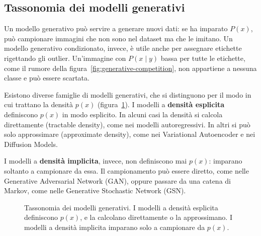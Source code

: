 \subsection{Tassonomia dei modelli generativi}\label{sec:tassonomia-generativi}
Un modello generativo può servire a generare nuovi dati: se ha imparato $P(x)$, può campionare immagini che non sono nel dataset ma che le imitano. Un modello generativo condizionato, invece, è utile anche per assegnare etichette rigettando gli outlier. Un'immagine con $P(x \mid y)$ bassa per tutte le etichette, come il rumore della figura~\ref{fig:generative-competition}, non appartiene a nessuna classe e può essere scartata.

Esistono diverse famiglie di modelli generativi, che si distinguono per il modo in cui trattano la densità $p(x)$ (figura~\ref{fig:tassonomia-generativi}). I modelli a \textbf{densità esplicita} definiscono $p(x)$ in modo esplicito. In alcuni casi la densità si calcola direttamente (tractable density), come nei modelli autoregressivi. In altri si può solo approssimare (approximate density), come nei Variational Autoencoder e nei Diffusion Models.

I modelli a \textbf{densità implicita}, invece, non definiscono mai $p(x)$: imparano soltanto a campionare da essa. Il campionamento può essere diretto, come nelle Generative Adversarial Network (GAN), oppure passare da una catena di Markov, come nelle Generative Stochastic Network (GSN).

\begin{figure}[htbp]
\centering
{}
\caption{Tassonomia dei modelli generativi. I modelli a densità esplicita definiscono $p(x)$, e la calcolano direttamente o la approssimano. I modelli a densità implicita imparano solo a campionare da $p(x)$.}
\label{fig:tassonomia-generativi}
\end{figure}

